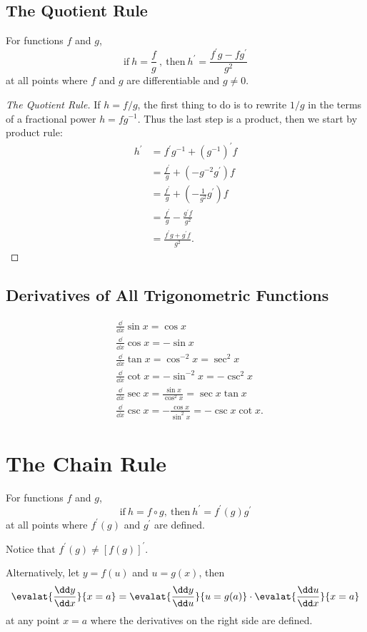 \subsection{The Quotient Rule}
For functions $f$ and $g$,
\[\text{if}\ h=\frac f g\ ,\ \text{then}\ h^\prime=\frac{f^\prime g-fg^\prime}{g^2}\] at all points where $f$ and $g$ are differentiable and $g\neq0$.
\begin{proof}[The Quotient Rule]
If $h=f/g$, the first thing to do is to rewrite $1/g$ in the terms of a fractional power $h=fg^{-1}$. Thus the last step is a product, then we start by product rule:
    \begin{align*}
        h^\prime & =f^\prime g^{-1}+(g^{-1})^\prime f\\
                 & =\frac{f^\prime}g+(-g^{-2}g^\prime)f\\
                 & =\frac{f^\prime}g+\left(-\frac1{g^2}g^\prime\right)f\\
                 & =\frac{f^\prime}g-\frac{g^\prime f}{g^2}\\
                 & =\frac{f^\prime g+g^\prime f}{g^2}.
    \end{align*}
\end{proof}

\subsection{Derivatives of All Trigonometric Functions}
\begin{align*}
  & \frac\dd{\dd x}\sin x=\cos x\\
  & \frac\dd{\dd x}\cos x=-\sin x\\
  & \frac\dd{\dd x}\tan x=\cos^{-2}x=\sec^2 x\\
  & \frac\dd{\dd x}\cot x=-\sin^{-2}x=-\csc^2 x\\
  & \frac\dd{\dd x}\sec x=\frac{\sin x}{\cos^2 x}=\sec x\tan x\\
  & \frac\dd{\dd x}\csc x=-\frac{\cos x}{\sin^2 x}=-\csc x\cot x.
\end{align*}

\section{The Chain Rule}
For functions $f$ and $g$,
\[\text{if}\ h=f\circ g,\ \text{then}\ h^\prime=f^\prime(g)g^\prime\]
at all points where $f^\prime(g)$ and $g^\prime$ are defined.
\begin{note}Notice that $f^\prime(g)\neq[f(g)]^\prime $.\end{note}
Alternatively, let $y=f(u)$ and $u=g(x)$, then
\[
\evalat{\frac{\dd y}{\dd x}}{x=a}=\evalat{\frac{\dd y}{\dd u}}{u=g(a)}\cdot\evalat{\frac{\dd u}{\dd x}}{x=a}
\]
at any point $x=a$ where the derivatives on the right side are defined.

